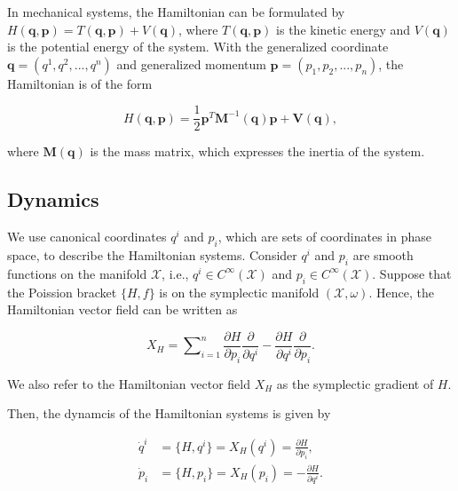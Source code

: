 \documentclass[
	parskip, 			   %
	twoside, 			   %
	DIV=14, 			   %
	BCOR=15.0mm, 		   %
	headsepline, 		   %
	open=right, 		   %
	captions=tableheading, %
	bibliography=totoc,    %
	numbers=noenddot       %
]{scrreprt}
\begin{document}
In mechanical systems, the Hamiltonian can be formulated by $H(\mathbf{q},\mathbf{p})=T(\mathbf{q},\mathbf{p})+V(\mathbf{q})$, where $T(\mathbf{q},\mathbf{p})$ is the kinetic energy and $V(\mathbf{q})$ is the potential energy of the system. With the generalized coordinate $\mathbf{q} = (q^1, q^2, ..., q^n)$ and generalized momentum $\mathbf{p} = (p_1, p_2, ..., p_n)$, the Hamiltonian is of the form

\begin{equation}
    \label{eq:Hamiltonian}
    H(\mathbf{q},\mathbf{p})=\frac{1}{2}\mathbf{p}^T\mathbf{M}^{-1}(\mathbf{q})\mathbf{p} + \mathbf{V}(\mathbf{q}),
\end{equation}

where $\mathbf{M}(\mathbf{q})$ is the mass matrix, which expresses the inertia of the system.

\subsection{Dynamics}
We use canonical coordinates $q^i$ and $p_i$, which are sets of coordinates in phase space, to describe the Hamiltonian systems. Consider $q^i$ and $p_i$ are smooth functions on the manifold $\mathcal{X}$, i.e., $q^i \in C^{\infty}(\mathcal{X})$ and $p_i \in C^{\infty}(\mathcal{X})$. Suppose that the Poission bracket $\{H, f\}$ is on the symplectic manifold $(\mathcal{X},\omega)$. Hence, the Hamiltonian vector field can be written as 

\begin{equation}
    \label{eq:Hamiltonian_vector_field}
    X_H = \sum\nolimits_{i=1}^n \frac{\partial H}{\partial p_i} \frac{\partial}{\partial q^i} - \frac{\partial H}{\partial q^i} \frac{\partial}{\partial p_i}.
\end{equation}

We also refer to the Hamiltonian vector field $X_H$ as the symplectic gradient of $H$.

Then, the dynamcis of the Hamiltonian systems is given by 

\begin{equation}
    \label{eq:Hamiltonian_dynamcis}
    \begin{aligned}
    \dot{q}^i &= \{H, q^i\} = X_H(q^i)=\frac{\partial H}{\partial p_i},\\
    \dot{p}_i &= \{H, p_i\}= X_H(p_i)=-\frac{\partial H}{\partial q^i}.
    \end{aligned}
\end{equation}
\end{document}
